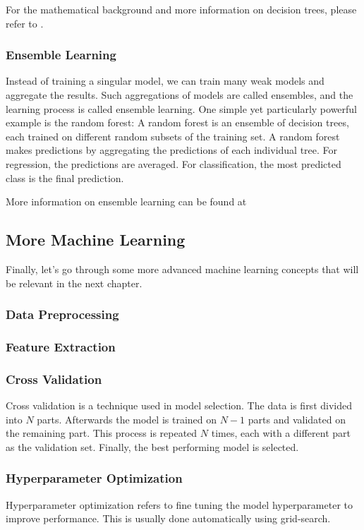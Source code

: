 For the mathematical background and more information on decision trees, please refer to \parencite{homl:6}.

\subsubsection{Ensemble Learning}
Instead of training a singular model, we can train many weak models and aggregate the results.
Such aggregations of models are called ensembles, and the learning process is called ensemble learning.
One simple yet particularly powerful example is the random forest:
A random forest is an ensemble of decision trees, each trained on different random subsets of the training set.
A random forest makes predictions by aggregating the predictions of each individual tree.
For regression, the predictions are averaged.
For classification, the most predicted class is the final prediction.\parencite{homl:7}
 
More information on ensemble learning can be found at \parencite{homl:7}

\subsection{More Machine Learning}
Finally, let's go through some more advanced machine learning concepts that will be relevant in the next chapter.
\subsubsection{Data Preprocessing}

\subsubsection{Feature Extraction}

\subsubsection{Cross Validation}
Cross validation is a technique used in model selection.
The data is first divided into $N$ parts.
Afterwards the model is trained on $N-1$ parts and validated on the remaining part.
This process is repeated $N$ times, each with a different part as the validation set.
Finally, the best performing model is selected.\parencite{ml:prml}
\subsubsection{Hyperparameter Optimization}
Hyperparameter optimization refers to fine tuning the model hyperparameter to improve performance.
This is usually done automatically using grid-search.\parencite{homl:2} 

